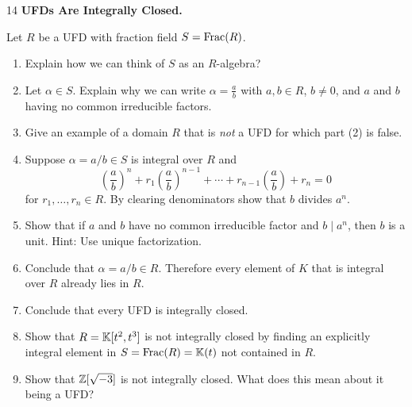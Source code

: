 \documentclass[Notebook.tex]{subfiles}
\begin{document}
\newpage

\begin{problem}{14}
    \textbf{UFDs Are Integrally Closed.} 
    
    Let $R$ be a UFD with fraction field $S=\text{Frac}(R)$.
    \begin{enumerate}
        \item Explain how we can think of $S$ as an $R$-algebra? 
        \item Let $\alpha\in S$. Explain why we can write $\alpha=\frac{a}{b}$ with $a,b\in R$, $b\neq 0$, and $a$ and $b$ having no common irreducible factors. 
        \item Give an example of a domain $R$ that is \emph{not} a UFD for which part (2) is false. 

        \item Suppose $\alpha=a/b \in S$ is integral over $R$ and
        \[
        \left(\frac{a}{b}\right)^n
        +r_1\left(\frac{a}{b}\right)^{n-1}
        +\cdots
        +r_{n-1}\left(\frac{a}{b}\right)
        +r_n
        =0
        \]
        for $r_1,\ldots,r_n\in R$. By clearing denominators show that $b$ divides $a^{n}$. 

        \item Show that if $a$ and $b$ have no common irreducible factor and $b\mid a^n$, then $b$ is a unit. Hint: Use unique factorization.

        \item Conclude that $\alpha=a/b\in R$. Therefore every element of $K$ that is integral over $R$ already lies in $R$.

        \item Conclude that every UFD is integrally closed.
        
        \item Show that $R=\mathbb K[t^2,t^3]$ is not integrally closed by finding an explicitly integral element in $S=\text{Frac}(R)=\mathbb K(t)$ not contained in $R$. 
        
        \item Show that $\mathbb Z[\sqrt{-3}]$ is not integrally closed. What does this mean about it being a UFD?
    \end{enumerate}    
\end{problem}
\end{document}

